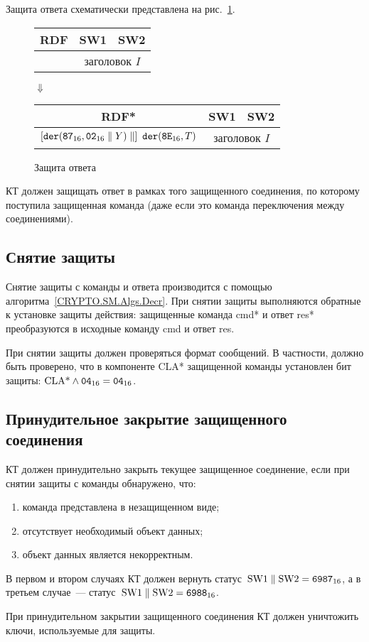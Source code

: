 Защита ответа схематически представлена на рис.~\ref{Fig.CMDS.ResEncr}. 

\begin{figure}[!h]
\begin{center}
\begin{tabular}{|c|c|c|}
\hline
RDF & SW1 & SW2 \\
\hline
\hline
[сообщение $X$] & \multicolumn{2}{|c|}{заголовок $I$} \\
\hline
\end{tabular}

\vskip3pt$\Downarrow$\vskip3pt

\begin{tabular}{|c|c|c|}
\hline
RDF* & SW1 & SW2 \\
\hline
\hline
$\left[\texttt{der}(\texttt{87}_{16},\texttt{02}_{16}\parallel Y)\parallel\right]\ \texttt{der}(\texttt{8E}_{16},T)$ & 
\multicolumn{2}{|c|}{заголовок $I$} \\
\hline
\end{tabular}
\end{center}
\caption{Защита ответа}\label{Fig.CMDS.ResEncr}
\end{figure}

КТ должен защищать ответ в рамках того защищенного соединения,
по которому поступила защищенная команда (даже если это команда 
переключения между соединениями). 

\subsection{Снятие защиты}\label{CMDS.SM.Decr}

Снятие защиты с команды и ответа производится с помощью 
алгоритма~\ref{CRYPTO.SM.Algs.Decr}.  
При снятии защиты выполняются обратные к установке защиты действия: 
защищенные команда cmd* и ответ res* преобразуются в исходные команду cmd  
и ответ res.  

При снятии защиты должен проверяться формат сообщений.
В частности, должно быть проверено, что в компоненте CLA* 
защищенной команды установлен бит защиты:
$\text{CLA*}\wedge\texttt{04}_{16}=\texttt{04}_{16}$.

\subsection{Принудительное закрытие защищенного соединения}
\label{CMDS.SM.Stop}

КТ должен принудительно закрыть текущее защищенное соединение, 
если при снятии защиты с команды обнаружено, что: 
\begin{enumerate}
\item[1)] команда представлена в незащищенном виде;
\item[2)] отсутствует необходимый объект данных;
\item[3)] объект данных является некорректным.
\end{enumerate}

В первом и втором случаях КТ должен вернуть 
статус~$\text{SW1} \parallel \text{SW2} = \texttt{6987}_{16}$, 
а в третьем случае~--- статус~$\text{SW1} \parallel \text{SW2} = 
\texttt{6988}_{16}$.  

При принудительном закрытии защищенного соединения КТ должен уничтожить 
ключи, используемые для защиты. 
